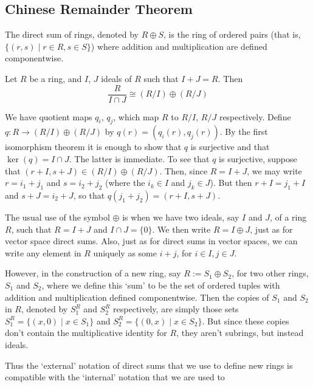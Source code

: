 \documentclass{maths}
\begin{document}
\subsection{Chinese Remainder Theorem}

The direct sum of rings, denoted by $R\oplus S$, is the ring of ordered pairs (that is, $\{(r,s) \mid r\in R,s\in S\}$) where addition and multiplication are defined componentwise.

\begin{thm}
    Let $R$ be a ring, and $I$, $J$ ideals of $R$ such that $I+J=R$.
    Then
    \[
        \frac{R}{I\cap J} \cong
        (R/I) \oplus (R/J)
    \]
\end{thm}

\begin{prf}
    We have quotient maps $q_i$, $q_j$, which map $R$ to $R/I$, $R/J$ respectively.
    Define $q\colon R\to(R/I)\oplus(R/J)$ by $q(r)=(q_i(r),q_j(r))$.
    By the first isomorphism theorem it is enough to show that $q$ is surjective and that $\ker(q)=I\cap J$.
    The latter is immediate.
    To see that $q$ is surjective, suppose that $(r+I,s+J)\in(R/I)\oplus(R/J)$.
    Then, since $R=I+J$, we may write $r=i_1+j_1$ and $s=i_2+j_2$ (where the $i_k\in I$ and $j_k\in J$).
    But then $r+I=j_1+I$ and $s+J=i_2+J$, so that $q(j_1+j_2)=(r+I,s+J)$.
\end{prf}

\begin{rem}
    The usual use of the symbol $\oplus$ is when we have two ideals, say $I$ and $J$, of a ring $R$, such that $R=I+J$ and $I\cap J=\{0\}$.
    We then write $R=I\oplus J$, just as for vector space direct sums.
    Also, just as for direct sums in vector spaces, we can write any element in $R$ uniquely as some $i+j$, for $i\in I,j\in J$.

    However, in the construction of a new ring, say $R:=S_1\oplus S_2$, for two other rings, $S_1$ and $S_2$, where we define this `sum' to be the set of ordered tuples with addition and multiplication defined componentwise.
    Then the copies of $S_1$ and $S_2$ in $R$, denoted by $S_1^R$ and $S_2^R$ respectively, are simply those sets $S_1^R=\{(x,0)\mid x\in S_1\}$ and $S_2^R=\{(0,x)\mid x\in S_2\}$.
    But since these copies don't contain the multiplicative identity for $R$, they aren't subrings, but instead ideals.

    Thus the `external' notation of direct sums that we use to define new rings is compatible with the `internal' notation that we are used to
\end{rem}
\end{document}
